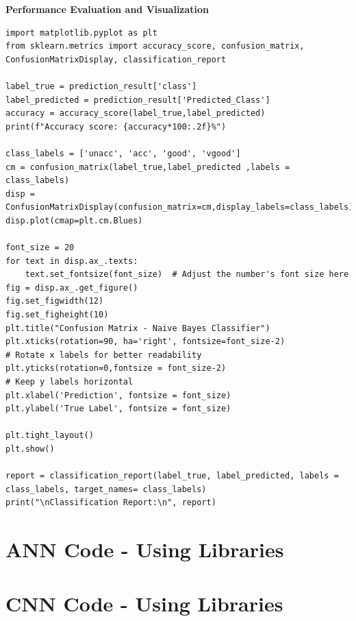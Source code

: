 \documentclass[a4paper]{article}
\begin{document}
\textbf{Performance Evaluation and Visualization}
\begin{lstlisting}
import matplotlib.pyplot as plt 
from sklearn.metrics import accuracy_score, confusion_matrix, ConfusionMatrixDisplay, classification_report

label_true = prediction_result['class']
label_predicted = prediction_result['Predicted_Class']
accuracy = accuracy_score(label_true,label_predicted)
print(f"Accuracy score: {accuracy*100:.2f}%")

class_labels = ['unacc', 'acc', 'good', 'vgood']
cm = confusion_matrix(label_true,label_predicted ,labels = class_labels)
disp = ConfusionMatrixDisplay(confusion_matrix=cm,display_labels=class_labels)
disp.plot(cmap=plt.cm.Blues)

font_size = 20
for text in disp.ax_.texts:
    text.set_fontsize(font_size)  # Adjust the number's font size here
fig = disp.ax_.get_figure()
fig.set_figwidth(12)
fig.set_figheight(10) 
plt.title("Confusion Matrix - Naive Bayes Classifier")
plt.xticks(rotation=90, ha='right', fontsize=font_size-2)                     # Rotate x labels for better readability
plt.yticks(rotation=0,fontsize = font_size-2)                                  # Keep y labels horizontal
plt.xlabel('Prediction', fontsize = font_size)
plt.ylabel('True Label', fontsize = font_size)

plt.tight_layout()
plt.show()

report = classification_report(label_true, label_predicted, labels = class_labels, target_names= class_labels)
print("\nClassification Report:\n", report)
\end{lstlisting}

\newpage
\section{ANN Code - Using Libraries}

\newpage
\section{CNN Code - Using Libraries}
\end{document}
